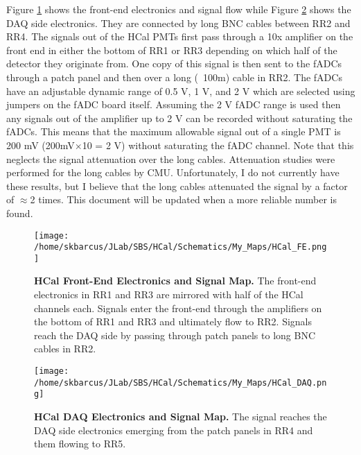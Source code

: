 \documentclass[10pt]{article}
\begin{document}
	Figure \ref{fig:FE} shows the front-end electronics and signal flow while Figure \ref{fig:DAQ} shows the DAQ side electronics. They are connected by long BNC cables between RR2 and RR4. The signals out of the HCal PMTs first pass through a 10x amplifier on the front end in either the bottom of RR1 or RR3 depending on which half of the detector they originate from. One copy of this signal is then sent to the fADCs through a patch panel and then over a long (~100m) cable in RR2. The fADCs have an adjustable dynamic range of 0.5 V, 1 V, and 2 V which are selected using jumpers on the fADC board itself. Assuming the 2 V fADC range is used then any signals out of the amplifier up to 2 V can be recorded without saturating the fADCs. This means that the maximum allowable signal out of a single PMT is 200 mV (200mV$\times$10 = 2 V) without saturating the fADC channel. Note that this neglects the signal attenuation over the long cables. Attenuation studies were performed for the long cables by CMU. Unfortunately, I do not currently have these results, but I believe that the long cables attenuated the signal by a factor of $\approx$2 times. This document will be updated when a more reliable number is found. 
\vspace{3mm}
	
	\begin{figure}[!ht]
	\begin{center}
	\texttt{[image: /home/skbarcus/JLab/SBS/HCal/Schematics/My\_Maps/HCal\_FE.png]}
	\end{center}
	\caption{
	{\bf{HCal Front-End Electronics and Signal Map.}} The front-end electronics in RR1 and RR3 are mirrored with half of the HCal channels each. Signals enter the front-end through the amplifiers on the bottom of RR1 and RR3 and ultimately flow to RR2. Signals reach the DAQ side by passing through patch panels to long BNC cables in RR2.}
	\label{fig:FE}
	\end{figure}	
	
	\begin{figure}[!ht]
	\begin{center}
	\texttt{[image: /home/skbarcus/JLab/SBS/HCal/Schematics/My\_Maps/HCal\_DAQ.png]}
	\end{center}
	\caption{
	{\bf{HCal DAQ Electronics and Signal Map.}} The signal reaches the DAQ side electronics emerging from the patch panels in RR4 and them flowing to RR5.}
	\label{fig:DAQ}
	\end{figure}		
	
\end{document}
